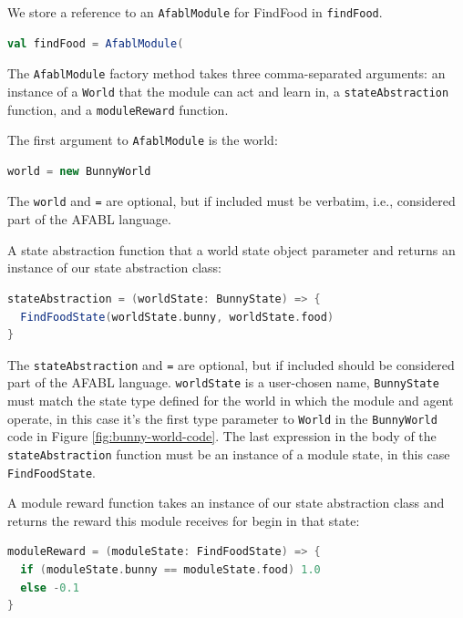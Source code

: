 We store a reference to an {\tt AfablModule} for FindFood in {\tt findFood}.

\begin{center}
\begin{lstlisting}[language=Scala,frame=none]
val findFood = AfablModule(
\end{lstlisting}
\end{center}

The {\tt AfablModule} factory method takes three comma-separated arguments: an instance of a {\tt World} that the module can act and learn in, a {\tt stateAbstraction} function, and a {\tt moduleReward} function.

The first argument to {\tt AfablModule} is the world:

\begin{center}
\begin{lstlisting}[language=Scala,frame=none]
world = new BunnyWorld
\end{lstlisting}
\end{center}

The {\tt world} and {\tt =} are optional, but if included must be verbatim, i.e., considered part of the AFABL language.

A state abstraction function that a world state object parameter and returns an instance of our state abstraction class:

\begin{center}
\begin{lstlisting}[language=Scala,frame=none]
stateAbstraction = (worldState: BunnyState) => {
  FindFoodState(worldState.bunny, worldState.food)
}
\end{lstlisting}
\end{center}

The {\tt stateAbstraction} and {\tt =} are optional, but if included should be considered part of the AFABL language. {\tt worldState} is a user-chosen name, {\tt BunnyState} must match the state type defined for the world in which the module and agent operate, in this case it's the first type parameter to {\tt World} in the {\tt BunnyWorld} code in Figure \ref{fig:bunny-world-code}. The last expression in the body of the {\tt stateAbstraction} function must be an instance of a module state, in this case {\tt FindFoodState}.

A module reward function takes an instance of our state abstraction class and returns the reward this module receives for begin in that state:

\begin{center}
\begin{lstlisting}[language=Scala,frame=none]
moduleReward = (moduleState: FindFoodState) => {
  if (moduleState.bunny == moduleState.food) 1.0
  else -0.1
}
\end{lstlisting}
\end{center}

